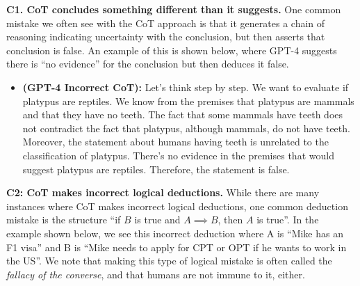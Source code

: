 \documentclass[11pt]{article}
\begin{document}
\textbf{C1. CoT concludes something different than it suggests.} One common mistake we often see with the CoT approach is that it generates a chain of reasoning indicating uncertainty with the conclusion, but then asserts that conclusion is false. An example of this is shown below, where GPT-4 suggests there is ``no evidence'' for the conclusion but then deduces it false.

\begin{itemize}[leftmargin=*]
    \item[] \small \textbf{(GPT-4 Incorrect CoT):} Let's think step by step. We want to evaluate if platypus are reptiles. We know from the premises that platypus are mammals and that they have no teeth. The fact that some mammals have teeth does not contradict the fact that platypus, although mammals, do not have teeth. Moreover, the statement about humans having teeth is unrelated to the classification of platypus. There's no evidence in the premises that would suggest platypus are reptiles. Therefore, the statement is false.
\end{itemize}

\textbf{C2: CoT makes incorrect logical deductions.} While there are many instances where CoT makes incorrect logical deductions, one common deduction mistake is the structure ``if $B$ is true and $A \implies B$, then $A$ is true''. In the example shown below, we see this incorrect deduction where A is ``Mike has an F1 visa'' and B is ``Mike needs to apply for CPT or OPT if he wants to work in the US''. We note that making this type of logical mistake is often called the \emph{fallacy of the converse}, and that humans are not immune to it, either.
\end{document}
